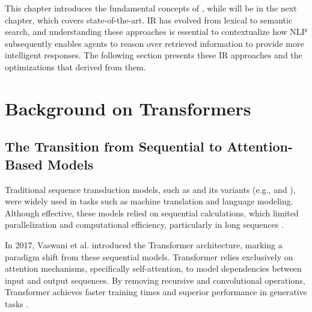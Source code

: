 \label{chap:back}

This chapter introduces the fundamental concepts of , while  will be 
in the next chapter, which covers state-of-the-art. \gls{IR} has evolved from lexical to semantic search, and understanding these approaches is essential to contextualize how \gls{NLP} subsequently enables agents to reason over retrieved information to provide more intelligent responses. The following section presents these \gls{IR} approaches and the optimizations that derived from them.
\section{Background on Transformers} 
\label{sec:transformer}
\subsection{The Transition from Sequential to Attention-Based Models}  
Traditional sequence transduction models, such as  and its variants (e.g.,  \cite{hochreiter1997lstm} and  \cite{cho2014gru}), were widely used in tasks such as machine translation and language modeling. Although effective, these models relied on sequential calculations, which limited parallelization and computational efficiency, particularly in long sequences \cite{vaswani2017attention}.

In 2017, Vaswani et al. introduced the Transformer architecture, marking a paradigm shift from these sequential models. Transformer relies exclusively on attention mechanisms, specifically self-attention, to model dependencies between input and output sequences. By removing recursive and convolutional operations, Transformer achieves faster training times and superior performance in generative tasks \cite{vaswani2017attention}.

